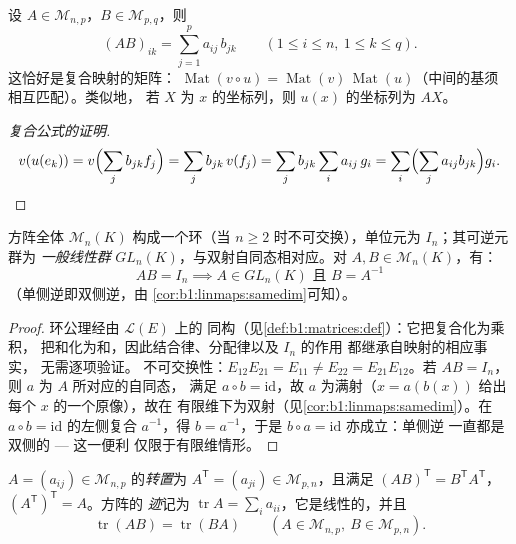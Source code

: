 \begin{definition}[乘积]\label{def:b1:matrices:product}
设 $A \in \mathcal{M}_{n,p}$，$B \in \mathcal{M}_{p,q}$，则
\[
(AB)_{ik} = \sum_{j=1}^{p} a_{ij}\, b_{jk}
\qquad (1 \leq i \leq n,\ 1 \leq k \leq q).
\]
这恰好是复合映射的矩阵：
$\operatorname{Mat}(v \circ u) = \operatorname{Mat}(v)\,
\operatorname{Mat}(u)$（中间的基须相互匹配）。类似地，
若 $X$ 为 $x$ 的坐标列，则 $u(x)$ 的坐标列为
$AX$。
\end{definition}

\begin{proof}[复合公式的证明]
\[
v(u(e_k)) = v\Bigl(\sum_j b_{jk} f_j\Bigr) = \sum_j b_{jk}\, v(f_j)
= \sum_j b_{jk} \sum_i a_{ij}\, g_i
= \sum_i \Bigl(\sum_j a_{ij} b_{jk}\Bigr) g_i . \qedhere
\]
\end{proof}

\begin{proposition}[代数 $\mathcal{M}_n(K)$]\label{prop:b1:matrices:ring}
方阵全体 $\mathcal{M}_n(K)$ 构成一个环（当 $n
\geq 2$ 时不可交换），单位元为 $I_n$；其可逆元群为
\emph{一般线性群}
$GL_n(K)$，与双射自同态相对应。对 $A, B \in
\mathcal{M}_n(K)$，有：
\[
AB = I_n \implies A \in GL_n(K) \text{ 且 } B = A^{-1}
\]
（单侧逆即双侧逆，由
\cref{cor:b1:linmaps:samedim}可知）。
\end{proposition}

\begin{proof}
环公理经由 $\mathcal{L}(E)$ 上的
同构（见\cref{def:b1:matrices:def}）：它把复合化为乘积，
把和化为和，因此结合律、分配律以及 $I_n$ 的作用
都继承自映射的相应事实，
无需逐项验证。
不可交换性：$E_{12}E_{21} = E_{11} \neq E_{22}
= E_{21}E_{12}$。若 $AB = I_n$，则 $a$ 为 $A$ 所对应的自同态，
满足 $a \circ b = \mathrm{id}$，故 $a$ 为满射（$x =
a(b(x))$ 给出每个 $x$ 的一个原像），故在
有限维下为双射（见\cref{cor:b1:linmaps:samedim}）。在 $a
\circ b = \mathrm{id}$ 的左侧复合 $a^{-1}$，得 $b =
a^{-1}$，于是 $b\circ a = \mathrm{id}$ 亦成立：单侧逆
一直都是双侧的 --- 这一便利
仅限于有限维情形。
\end{proof}

\begin{definition}[转置；迹]\label{def:b1:matrices:transpose}
$A = (a_{ij}) \in \mathcal{M}_{n,p}$ 的\emph{转置}为 $A^{\mathsf T}
= (a_{ji}) \in \mathcal{M}_{p,n}$，且满足 $(AB)^{\mathsf T} = B^{\mathsf T}
A^{\mathsf T}$，$(A^{\mathsf T})^{\mathsf T} = A$。方阵的
\emph{迹}记为 $\operatorname{tr} A
= \sum_i a_{ii}$，它是线性的，并且
\[
\operatorname{tr}(AB) = \operatorname{tr}(BA)
\qquad (A \in \mathcal{M}_{n,p},\ B \in \mathcal{M}_{p,n}).
\]
\end{definition}

